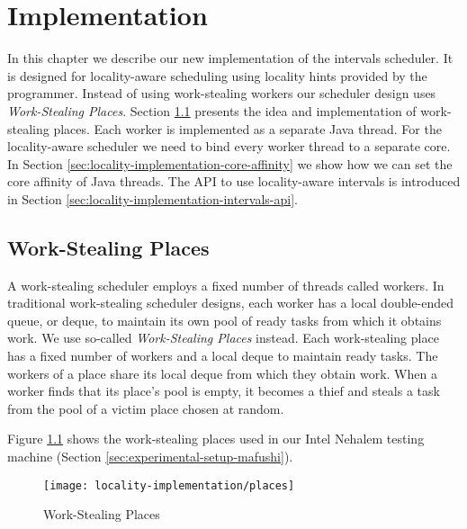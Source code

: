 
\chapter{Implementation}
\label{chap:locality-implementation}

In this chapter we describe our new implementation of the intervals
scheduler. It is designed for locality-aware scheduling using locality
hints provided by the programmer. Instead of using work-stealing
workers our scheduler design uses \emph{Work-Stealing Places}. Section
\ref{sec:locality-implementation-work-stealing-places} presents the
idea and implementation of work-stealing places. Each worker is
implemented as a separate Java thread. For the locality-aware
scheduler we need to bind every worker thread to a separate core. In
Section \ref{sec:locality-implementation-core-affinity} we show how we
can set the core affinity of Java threads. The API to use
locality-aware intervals is introduced in Section
\ref{sec:locality-implementation-intervals-api}.


\section{Work-Stealing Places}
\label{sec:locality-implementation-work-stealing-places}

A work-stealing scheduler employs a fixed number of threads called
workers. In traditional work-stealing scheduler designs, each worker
has a local double-ended queue, or deque, to maintain its own pool of
ready tasks from which it obtains work. We use so-called
\emph{Work-Stealing Places} instead. Each work-stealing place has a
fixed number of workers and a local deque to maintain ready tasks. The
workers of a place share its local deque from which they obtain
work. When a worker finds that its place's pool is empty, it becomes a
thief and steals a task from the pool of a victim place chosen at
random.

Figure \ref{fig:locality-implementation-work-stealing-places} shows
the work-stealing places used in our Intel Nehalem testing machine
(Section \ref{sec:experimental-setup-mafushi}).

\begin{figure}[!ht]
  \centering
  \texttt{[image: locality-implementation/places]}
  \caption{Work-Stealing Places}
  \label{fig:locality-implementation-work-stealing-places}
\end{figure}

